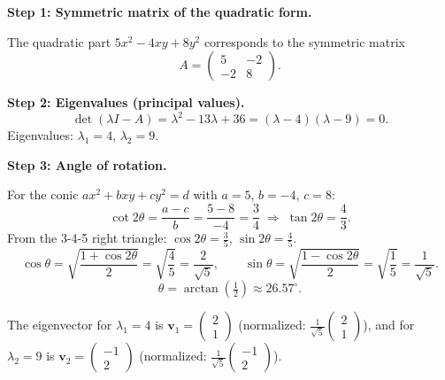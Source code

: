 \documentclass[12pt,a3paper]{article}
\begin{document}
\begin{tcolorbox}[enhanced,breakable,
  colback=cE!4,colframe=cE,boxrule=0.8pt,arc=5pt,
  title={\textbf{Answer --- Conic Section: $5x^2 - 4xy + 8y^2 - 36 = 0$}},
  fonttitle=\bfseries\color{white},colbacktitle=cE]
 
\textbf{Step 1: Symmetric matrix of the quadratic form.}
 
The quadratic part $5x^2 - 4xy + 8y^2$ corresponds to the symmetric matrix
\[
  A = \begin{pmatrix}5 & -2 \\ -2 & 8\end{pmatrix}.
\]
 
\textbf{Step 2: Eigenvalues (principal values).}
\[
  \det(\lambda I - A) = \lambda^2 - 13\lambda + 36 = (\lambda - 4)(\lambda - 9) = 0.
\]
Eigenvalues: $\lambda_1 = 4$,\; $\lambda_2 = 9$.
 
\textbf{Step 3: Angle of rotation.}
 
For the conic $ax^2 + bxy + cy^2 = d$ with $a=5$, $b=-4$, $c=8$:
\[
  \cot 2\theta = \frac{a - c}{b} = \frac{5-8}{-4} = \frac{3}{4}
  \;\Longrightarrow\; \tan 2\theta = \frac{4}{3}.
\]
From the 3-4-5 right triangle: $\cos 2\theta = \tfrac{3}{5}$, $\sin 2\theta = \tfrac{4}{5}$.
\[
  \cos\theta = \sqrt{\frac{1+\cos 2\theta}{2}} = \sqrt{\frac{4}{5}} = \frac{2}{\sqrt{5}},
  \qquad
  \sin\theta = \sqrt{\frac{1-\cos 2\theta}{2}} = \sqrt{\frac{1}{5}} = \frac{1}{\sqrt{5}}.
\]
\[
  \boxed{\theta = \arctan\!\left(\tfrac{1}{2}\right) \approx 26.57^\circ.}
\]
 
The eigenvector for $\lambda_1=4$ is $\mathbf{v}_1 = \begin{pmatrix}2\\1\end{pmatrix}$ (normalized:
$\tfrac{1}{\sqrt{5}}\begin{pmatrix}2\\1\end{pmatrix}$), and for $\lambda_2=9$ is
$\mathbf{v}_2 = \begin{pmatrix}-1\\2\end{pmatrix}$ (normalized:
$\tfrac{1}{\sqrt{5}}\begin{pmatrix}-1\\2\end{pmatrix}$).
 

\end{tcolorbox}
\end{document}
